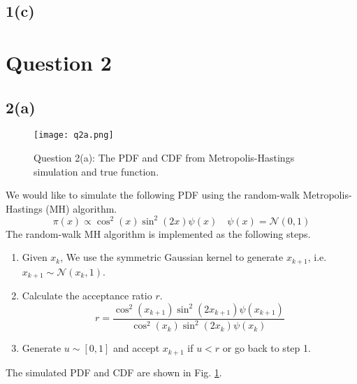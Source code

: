 \documentclass[a4paper, 11pt]{article}
\begin{document}
\subsection*{1(c)}








\section*{Question 2}
\subsection*{2(a)}


\begin{figure}
	\begin{center}
		\texttt{[image: q2a.png]}
		\caption{Question 2(a): The PDF and CDF from Metropolis-Hastings simulation and true function. }
	\end{center}
	\label{fig:q2a}
\end{figure}

We would like to simulate the following PDF using the random-walk Metropolis-Hastings (MH) algorithm. 
\begin{equation}
\pi(x) \propto \cos^2(x)\sin^2(2x)\psi(x) \quad \psi(x) = \mathcal{N}(0,1)
\end{equation}
The random-walk MH algorithm is implemented as the following steps. 
\begin{enumerate}
\item Given $x_k$, We use the symmetric Gaussian kernel to generate $x_{k+1}$, i.e. $x_{k+1}\sim\mathcal{N}(x_k, 1)$. 
\item Calculate the acceptance ratio $r$. 
\begin{equation}
r = \frac{\cos^2(x_{k+1})\sin^2(2x_{k+1})\psi(x_{k+1})}{\cos^2(x_k)\sin^2(2x_k)\psi(x_k)}
\end{equation}
\item Generate $u\sim [0,1]$ and accept $x_{k+1}$ if $u < r$ or go back to step 1. 
\end{enumerate}
The simulated PDF and CDF are shown in Fig. \ref{fig:q2a}. 
\end{document}
